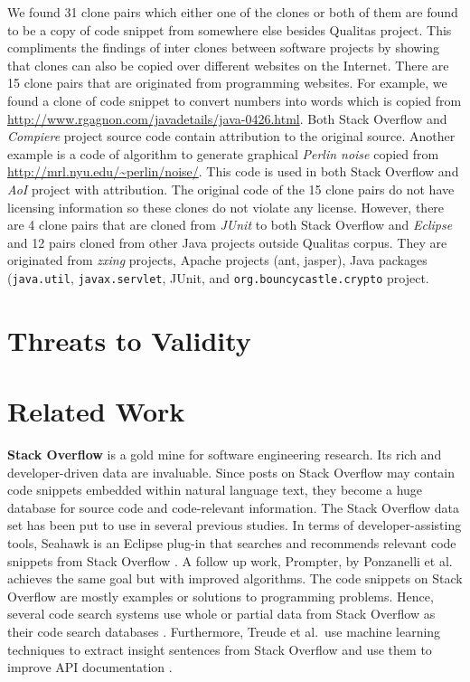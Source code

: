 \documentclass{sig-alternate-05-2015}
\begin{document}
We found 31 clone pairs which either one of the clones or both of them are found to be a copy of code snippet from somewhere else besides Qualitas project. This compliments the findings of inter clones between software projects \cite{Svajlenko2014} by showing that clones can also be copied over different websites on the Internet. There are 15 clone pairs that are originated from programming websites. For example, we found a clone of code snippet to convert numbers into words which is copied from \url{http://www.rgagnon.com/javadetails/java-0426.html}. Both Stack Overflow and \textit{Compiere} project source code contain attribution to the original source. Another example is a code of algorithm to generate graphical \textit{Perlin noise} copied from \url{http://mrl.nyu.edu/~perlin/noise/}. This code is used in both Stack Overflow and \textit{AoI} project with attribution. The original code of the 15 clone pairs do not have licensing information so these clones do not violate any license. However, there are 4 clone pairs that are cloned from \textit{JUnit} to both Stack Overflow and \textit{Eclipse} and 12 pairs cloned from other Java projects outside Qualitas corpus. They are originated from \textit{zxing} projects, Apache projects (ant, jasper), Java packages (\texttt{java.util}, \texttt{javax.servlet}, JUnit, and \texttt{org.bouncycastle.crypto} project.

\section{Threats to Validity}

\section{Related Work}

\textbf{Stack Overflow} is a gold mine for software engineering research. Its rich and developer-driven data are invaluable. Since posts on Stack Overflow may contain code snippets embedded within natural language text, they become a huge database for source code and code-relevant information. The Stack Overflow data set has been put to use in several previous studies. In terms of developer-assisting tools, Seahawk is an Eclipse plug-in that searches and recommends relevant code snippets from Stack Overflow \cite{Ponzanelli2013}. A follow up work, Prompter, by Ponzanelli et al.~\cite{Ponzanelli2014} achieves the same goal but with improved algorithms. The code snippets on Stack Overflow are mostly examples or solutions to programming problems. Hence, several code search systems use whole or partial data from Stack Overflow as their code search databases \cite{Diamantopoulos2015,Keivanloo2014,Park2014, Stolee2014,Subramanian2013,Diamantopoulos2015}. Furthermore, Treude et al.~use machine learning techniques to extract insight sentences from Stack Overflow and use them to improve API documentation \cite{Treude2016}.
\end{document}

